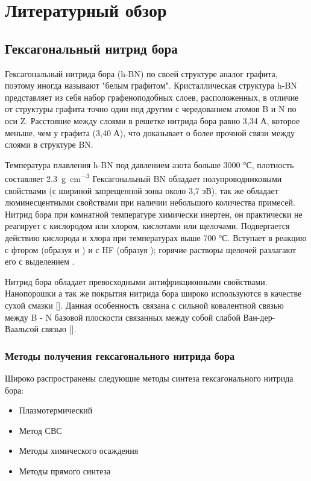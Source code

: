 \chapter{Литературный обзор}%
\label{cha:Литературный обзор}
\section{Гексагональный нитрид бора}%
\label{sec:Гексагональный нитрид бора}

Гексагональный нитрида бора (h-BN) по своей структуре аналог графита, поэтому
иногда называют "белым графитом". Кристаллическая структура h-BN представляет
из себя набор графеноподобных слоев, расположенных, в отличие от структуры 
графита точно один под другим с чередованием атомов B и N по оси Z. Расстояние 
между слоями в решетке нитрида бора равно 3,34 А, которое меньше, чем у графита
(3,40 А), что доказывает о более прочной связи между слоями в структуре BN.

Температура плавления h-BN под давлением азота больше 3000 °С, плотность 
составляет \SI{2.3}{\gram\per\cm^3} Гексагональный BN обладает полупроводниковыми свойствами
(с шириной запрещенной зоны около 3,7 эВ), так же обладает люминесцентными 
свойствами при наличии небольшого количества примесей. Нитрид бора при 
комнатной температуре химически инертен, он практически не реагирует с 
кислородом или хлором, кислотами или щелочами. Подвергается действию кислорода 
и хлора при температурах выше 700 °С. Вступает в реакцию с фтором (образуя  
и ) и с HF (образуя ); горячие растворы щелочей разлагают его с 
выделением .

Нитрид бора обладает превосходными антифрикционными свойствами. Нанопорошки
а так же покрытия нитрида бора широко используются в качестве сухой смазки [].
Данная особенность связана с сильной ковалентной связью между B - N базовой плоскости 
связанных между собой слабой Ван-дер-Ваальсой связью [].

\subsection{Методы получения гексагонального нитрида бора}%
\label{sub:Методы получения гексагонального нитрида бора}


Широко распространены следующие методы синтеза гексагонального нитрида бора:

\begin{itemize}
    \item Плазмотермический
    \item Метод СВС
    \item Методы химического осаждения
    \item Методы прямого синтеза
\end{itemize}

